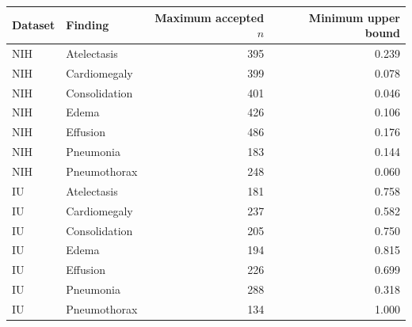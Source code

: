 \begin{center}\small\begin{tabular}{llrr}\toprule
Dataset & Finding & Maximum accepted $n$ & Minimum upper bound\\\midrule
NIH & Atelectasis & 395 & 0.239 \\
NIH & Cardiomegaly & 399 & 0.078 \\
NIH & Consolidation & 401 & 0.046 \\
NIH & Edema & 426 & 0.106 \\
NIH & Effusion & 486 & 0.176 \\
NIH & Pneumonia & 183 & 0.144 \\
NIH & Pneumothorax & 248 & 0.060 \\
IU & Atelectasis & 181 & 0.758 \\
IU & Cardiomegaly & 237 & 0.582 \\
IU & Consolidation & 205 & 0.750 \\
IU & Edema & 194 & 0.815 \\
IU & Effusion & 226 & 0.699 \\
IU & Pneumonia & 288 & 0.318 \\
IU & Pneumothorax & 134 & 1.000 \\
\bottomrule\end{tabular}\end{center}
